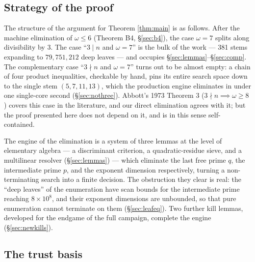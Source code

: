 \documentclass[11pt]{article}
\theoremstyle{remark}
\begin{document}
\subsection{Strategy of the proof}

The structure of the argument for Theorem \ref{thm:main} is as follows. After the machine elimination of $\omega \le 6$ (Theorem B4, \S\ref{sec:b4}), the case $\omega = 7$ splits along divisibility by 3. The case ``$3 \mid n$ and $\omega = 7$'' is the bulk of the work --- 381 stems expanding to $79{,}751{,}212$ deep leaves --- and occupies \S\ref{sec:lemmas}--\S\ref{sec:comp}. The complementary case ``$3 \nmid n$ and $\omega = 7$'' turns out to be almost empty: a chain of four product inequalities, checkable by hand, pins its entire search space down to the single stem $(5, 7, 11, 13)$, which the production engine eliminates in under one single-core second (\S\ref{sec:nothree}). Abbott's 1973 Theorem 3 ($3 \nmid n \implies \omega \ge 8$) covers this case in the literature, and our direct elimination agrees with it; but the proof presented here does not depend on it, and is in this sense self-contained.

The engine of the elimination is a system of three lemmas at the level of elementary algebra --- a discriminant criterion, a quadratic-residue sieve, and a multilinear resolver (\S\ref{sec:lemmas}) --- which eliminate the last free prime $q$, the intermediate prime $p$, and the exponent dimension respectively, turning a non-terminating search into a finite decision. The obstruction they clear is real: the ``deep leaves'' of the enumeration have scan bounds for the intermediate prime reaching $8 \times 10^8$, and their exponent dimensions are unbounded, so that pure enumeration cannot terminate on them (\S\ref{sec:leafeq}). Two further kill lemmas, developed for the endgame of the full campaign, complete the engine (\S\ref{sec:newkills}).

\subsection{The trust basis}
\end{document}
